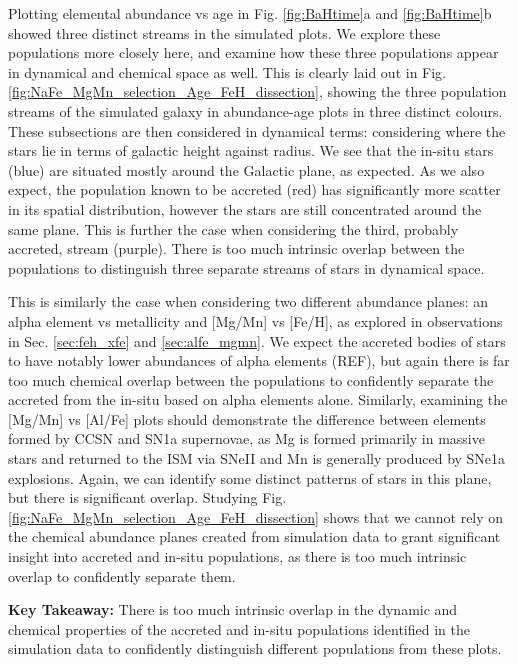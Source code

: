 \documentclass[fleqn,usenatbib]{mnras}
\begin{document}
Plotting elemental abundance vs age in Fig. \ref{fig:BaHtime}a and \ref{fig:BaHtime}b showed three distinct streams in the simulated plots. We explore these populations more closely here, and examine how these three populations appear in dynamical and chemical space as well. This is clearly laid out in Fig. \ref{fig:NaFe_MgMn_selection_Age_FeH_dissection}, showing the three population streams of the simulated galaxy in abundance-age plots in three distinct colours. These subsections are then considered in dynamical terms: considering where the stars lie in terms of galactic height against radius. We see that the in-situ stars (blue) are situated mostly around the Galactic plane, as expected. As we also expect, the population known to be accreted (red) has significantly more scatter in its spatial distribution, however the stars are still concentrated around the same plane. This is further the case when considering the third, probably accreted, stream (purple). There is too much intrinsic overlap between the populations to distinguish three separate streams of stars in dynamical space. \par 
This is similarly the case when considering two different abundance planes: an alpha element vs metallicity and [Mg/Mn] vs [Fe/H], as explored in observations in Sec. \ref{sec:feh_xfe} and \ref{sec:alfe_mgmn}. We expect the accreted bodies of stars to have notably lower abundances of alpha elements (REF), but again there is far too much chemical overlap between the populations to confidently separate the accreted from the in-situ based on alpha elements alone. Similarly, examining the [Mg/Mn] vs [Al/Fe] plots should demonstrate the difference between elements formed by CCSN and SN1a supernovae, as Mg is formed primarily in massive stars and returned to the ISM via SNeII \citep{Kobayashi2020} and Mn is generally produced by SNe1a explosions. Again, we can identify some distinct patterns of stars in this plane, but there is significant overlap. Studying Fig. \ref{fig:NaFe_MgMn_selection_Age_FeH_dissection} shows that we cannot rely on the chemical abundance planes created from simulation data to grant significant insight into accreted and in-situ populations, as there is too much intrinsic overlap to confidently separate them. \par 
\textbf{Key Takeaway:} There is too much intrinsic overlap in the dynamic and chemical properties of the accreted and in-situ populations identified in the simulation data to confidently distinguish different populations from these plots. 
\end{document}
